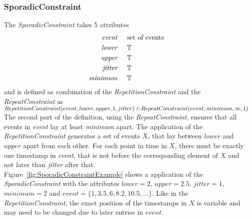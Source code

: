 	\subsubsection{SporadicConstraint}
		The \emph{SporadicConstraint} takes 5 attributes
		\begin{align*}
			\emph{event} 	& \hspace{.5cm}\text{set of events}\\
			\emph{lower} 	& \hspace{.5cm}\mathbb{T}\\
			\emph{upper} 	& \hspace{.5cm}\mathbb{T}\\
			\emph{jitter}	& \hspace{.5cm}\mathbb{T}\\
			\emph{minimum}	& \hspace{.5cm}\mathbb{T}
		\end{align*}
		and is defined as combination of the \emph{RepetitionConstraint} and the \emph{RepeatConstraint} as\\[10pt]
		\begin{math}
			RepetitionConstraint(event, lower, upper, 1, jitter)\\
			\land RepeatConstraint(event, minimum, \infty, 1)
		\end{math}\\[10pt]
		The second part of the definition, using the \emph{RepeatConstraint}, ensures that all events in \emph{event} lay at least \emph{minimum} apart. The application of the \emph{RepetitionConstraint} generates a set of events $X$, that lay between $lower$ and $upper$ apart from each other. For each point in time in $X$, there must be exactly one timestamp in \emph{event}, that is not before the corresponding element of $X$ and not later than \emph{jitter} after that.\\
		Figure~\ref{fig:SporadicConstraintExample} shows a application of the \emph{SporadicConstraint} with the attributes $lower=2$, $upper=2.5$, $jitter=1$, $minimum=2$ and $event=\{1, 3.5, 6, 8.2, 10.5,...\}$. Like in the \emph{RepetitionConstraint}, the exact position of the timestamps in $X$ is variable and may need to be changed due to later entries in $event$.
